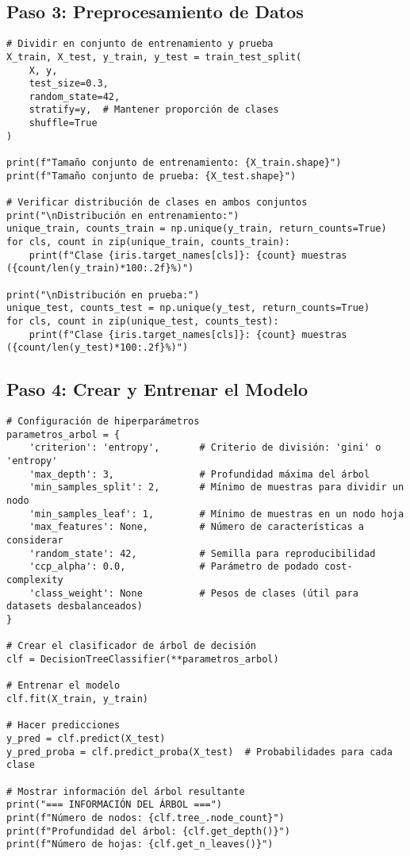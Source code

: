 \documentclass[12pt]{article}
\begin{document}
\subsection{Paso 3: Preprocesamiento de Datos}
\begin{lstlisting}
# Dividir en conjunto de entrenamiento y prueba
X_train, X_test, y_train, y_test = train_test_split(
    X, y, 
    test_size=0.3, 
    random_state=42, 
    stratify=y,  # Mantener proporción de clases
    shuffle=True
)

print(f"Tamaño conjunto de entrenamiento: {X_train.shape}")
print(f"Tamaño conjunto de prueba: {X_test.shape}")

# Verificar distribución de clases en ambos conjuntos
print("\nDistribución en entrenamiento:")
unique_train, counts_train = np.unique(y_train, return_counts=True)
for cls, count in zip(unique_train, counts_train):
    print(f"Clase {iris.target_names[cls]}: {count} muestras ({count/len(y_train)*100:.2f}%)")

print("\nDistribución en prueba:")
unique_test, counts_test = np.unique(y_test, return_counts=True)
for cls, count in zip(unique_test, counts_test):
    print(f"Clase {iris.target_names[cls]}: {count} muestras ({count/len(y_test)*100:.2f}%)")
\end{lstlisting}

\subsection{Paso 4: Crear y Entrenar el Modelo}
\begin{lstlisting}
# Configuración de hiperparámetros
parametros_arbol = {
    'criterion': 'entropy',       # Criterio de división: 'gini' o 'entropy'
    'max_depth': 3,               # Profundidad máxima del árbol
    'min_samples_split': 2,       # Mínimo de muestras para dividir un nodo
    'min_samples_leaf': 1,        # Mínimo de muestras en un nodo hoja
    'max_features': None,         # Número de características a considerar
    'random_state': 42,           # Semilla para reproducibilidad
    'ccp_alpha': 0.0,             # Parámetro de podado cost-complexity
    'class_weight': None          # Pesos de clases (útil para datasets desbalanceados)
}

# Crear el clasificador de árbol de decisión
clf = DecisionTreeClassifier(**parametros_arbol)

# Entrenar el modelo
clf.fit(X_train, y_train)

# Hacer predicciones
y_pred = clf.predict(X_test)
y_pred_proba = clf.predict_proba(X_test)  # Probabilidades para cada clase

# Mostrar información del árbol resultante
print("=== INFORMACIÓN DEL ÁRBOL ===")
print(f"Número de nodos: {clf.tree_.node_count}")
print(f"Profundidad del árbol: {clf.get_depth()}")
print(f"Número de hojas: {clf.get_n_leaves()}")
\end{lstlisting}
\end{document}
